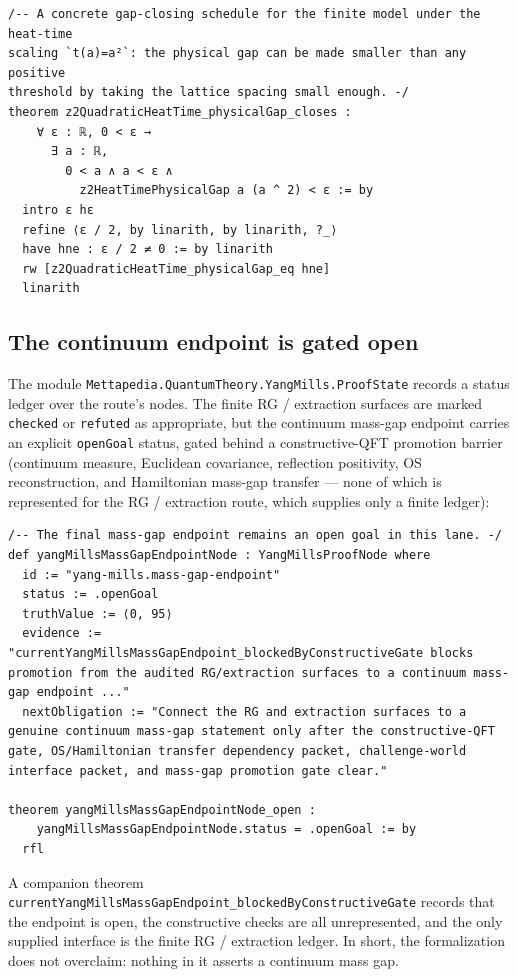 \documentclass[11pt]{article}
\theoremstyle{definition}
\begin{document}
\begin{lstlisting}
/-- A concrete gap-closing schedule for the finite model under the heat-time
scaling `t(a)=a²`: the physical gap can be made smaller than any positive
threshold by taking the lattice spacing small enough. -/
theorem z2QuadraticHeatTime_physicalGap_closes :
    ∀ ε : ℝ, 0 < ε →
      ∃ a : ℝ,
        0 < a ∧ a < ε ∧
          z2HeatTimePhysicalGap a (a ^ 2) < ε := by
  intro ε hε
  refine ⟨ε / 2, by linarith, by linarith, ?_⟩
  have hne : ε / 2 ≠ 0 := by linarith
  rw [z2QuadraticHeatTime_physicalGap_eq hne]
  linarith
\end{lstlisting}

\subsection{The continuum endpoint is gated open}

The module \texttt{Mettapedia.QuantumTheory.YangMills.ProofState} records a
status ledger over the route's nodes. The finite RG / extraction surfaces are
marked \texttt{checked} or \texttt{refuted} as appropriate, but the continuum
mass-gap endpoint carries an explicit \texttt{openGoal} status, gated behind a
constructive-QFT promotion barrier (continuum measure, Euclidean covariance,
reflection positivity, OS reconstruction, and Hamiltonian mass-gap transfer ---
none of which is represented for the RG / extraction route, which supplies only
a finite ledger):

\begin{lstlisting}
/-- The final mass-gap endpoint remains an open goal in this lane. -/
def yangMillsMassGapEndpointNode : YangMillsProofNode where
  id := "yang-mills.mass-gap-endpoint"
  status := .openGoal
  truthValue := ⟨0, 95⟩
  evidence := "currentYangMillsMassGapEndpoint_blockedByConstructiveGate blocks promotion from the audited RG/extraction surfaces to a continuum mass-gap endpoint ..."
  nextObligation := "Connect the RG and extraction surfaces to a genuine continuum mass-gap statement only after the constructive-QFT gate, OS/Hamiltonian transfer dependency packet, challenge-world interface packet, and mass-gap promotion gate clear."

theorem yangMillsMassGapEndpointNode_open :
    yangMillsMassGapEndpointNode.status = .openGoal := by
  rfl
\end{lstlisting}

A companion theorem \texttt{currentYangMillsMassGapEndpoint\_blockedByConstructiveGate}
records that the endpoint is open, the constructive checks are all unrepresented,
and the only supplied interface is the finite RG / extraction ledger. In short,
the formalization does not overclaim: nothing in it asserts a continuum mass gap.
\end{document}
